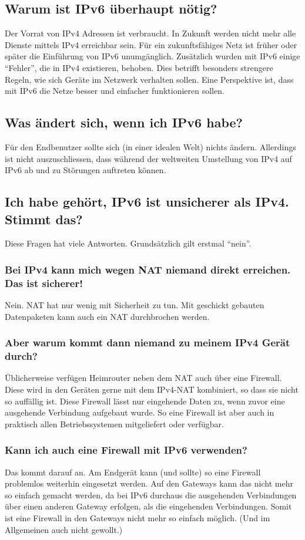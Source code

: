 \documentclass[10pt,a4paper,oneside]{scrartcl}
\begin{document}
\subsection*{Warum ist IPv6 überhaupt nötig?}
Der Vorrat von IPv4 Adressen ist verbraucht. In Zukunft werden nicht mehr alle Dienste mittels IPv4 erreichbar sein.
Für ein zukunftsfähiges Netz ist früher oder später die Einführung von IPv6 unumgänglich.
Zusätzlich wurden mit IPv6 einige ``Fehler'', die in IPv4 existieren, behoben.
Dies betrifft besonders strengere Regeln, wie sich Geräte im Netzwerk verhalten sollen.
Eine Perspektive ist, dass mit IPv6 die Netze besser und einfacher funktionieren sollen.

\subsection*{Was ändert sich, wenn ich IPv6 habe?}
Für den Endbenutzer sollte sich (in einer idealen Welt) nichts ändern.
Allerdings ist nicht auszuschliessen, dass während der weltweiten Umstellung von
IPv4 auf IPv6 ab und zu Störungen auftreten können.

\subsection*{Ich habe gehört, IPv6 ist unsicherer als IPv4. Stimmt das?}
Diese Fragen hat viele Antworten. Grundsätzlich gilt erstmal ``nein''.

\subsubsection*{Bei IPv4 kann mich wegen NAT niemand direkt erreichen. Das ist sicherer!}
Nein. NAT hat nur wenig mit Sicherheit zu tun. Mit geschickt gebauten Datenpaketen kann auch
ein NAT durchbrochen werden.

\subsubsection*{Aber warum kommt dann niemand zu meinem IPv4 Gerät durch?}
Üblicherweise verfügen Heimrouter neben dem NAT auch über eine Firewall.
Diese wird in den Geräten gerne mit dem IPv4-NAT kombiniert,
so dass sie nicht so auffällig ist. Diese Firewall lässt nur eingehende Daten zu,
wenn zuvor eine ausgehende Verbindung aufgebaut wurde.
So eine Firewall ist aber auch in praktisch allen Betriebssystemen mitgeliefert
oder verfügbar.

\subsubsection*{Kann ich auch eine Firewall mit IPv6 verwenden?}
Das kommt darauf an. Am Endgerät kann (und sollte) so eine Firewall problemlos
weiterhin eingesetzt werden.
Auf den Gateways kann das nicht mehr so einfach gemacht werden, da bei IPv6
durchaus die ausgehenden Verbindungen über einen anderen Gateway erfolgen,
als die eingehenden Verbindungen. Somit ist eine Firewall in den Gateways
nicht mehr so einfach möglich. (Und im Allgemeinen auch nicht gewollt.)
\end{document}
